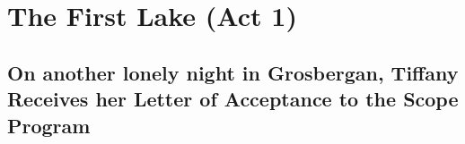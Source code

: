 \chapter{The First Lake (Act 1)}

\section{On another lonely night in Grosbergan, Tiffany Receives her Letter of Acceptance to the Scope Program}

